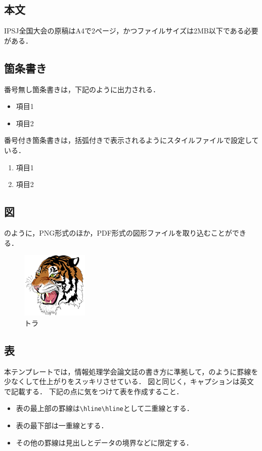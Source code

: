 \documentclass[a4j,10pt,twocolumn,uplatex]{jsarticle}
\begin{document}
\subsection{本文}
IPSJ全国大会の原稿はA4で2ページ，かつファイルサイズは2MB以下である必要がある．

\subsection{箇条書き}
番号無し箇条書きは，下記のように出力される．
\begin{itemize}
    \item 項目1
    \item 項目2
\end{itemize}

番号付き箇条書きは，括弧付きで表示されるようにスタイルファイルで設定している．
\begin{enumerate}
    \item 項目1
    \item 項目2
\end{enumerate}

\subsection{図}
のように，PNG形式のほか，PDF形式の図形ファイルを取り込むことができる．

\begin{figure}[tb]
    \centering
    \includegraphics[scale=1.0,clip]{fig/tiger.png}
    \caption{トラ}
    \label{fig:tiger}
\end{figure}

\subsection{表}
本テンプレートでは，情報処理学会論文誌の書き方に準拠して，のように罫線を少なくして仕上がりをスッキリさせている．
図と同じく，キャプションは英文で記載する．
下記の点に気をつけて表を作成すること．
\begin{itemize}
    \item 表の最上部の罫線は\verb|\hline\hline|として二重線とする．
    \item 表の最下部は一重線とする．
    \item その他の罫線は見出しとデータの境界などに限定する．
\end{itemize}
\end{document}
